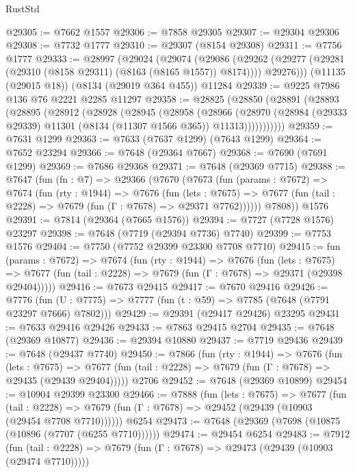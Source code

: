 \begin{lexlean}{RustStd}
\begin{coremodule}
{\begin{coremodule}
{{{{{{{{{{{{{{{{{{{{{{{{{{{{{{{{{{{{{{{{{{{{{{{{{{{{{@29305 := @7662 @1557
@29306 := @7858 @29305
@29307 := @29304 @29306
@29308 := @7732 @1777
@29310 := @29307 (@8154 @29308)
@29311 := @7756 @1777
@29333 := @28997
    (@29024
      (@29074
        (@29086
          (@29262 (@29277 (@29281 (@29310 (@8158 @29311) (@8163 (@8165 @1557)) @8174))))
          @29276)))
    (@11135 (@29015 @18))
    (@8134 (@29019 @364 @455))
    @11284
@29339 := @9225 @7986 @136 @76 @2221 @2285 @11297
@29358 := @28825
    (@28850
      (@28891
        (@28893
          (@28895
            (@28912
              (@28928
                (@28945
                  (@28958
                    (@28966
                      (@28970
                        (@28984 (@29333 @29339) @11301 (@8134 (@11307 @1566 @365)) @11313)))))))))))
@29359 := @7631 @1299
@29363 := @7633 (@7637 @1299) (@7643 @1299)
@29364 := @7652 @23294
@29366 := @7648 (@29364 @7667)
@29368 := @7690 (@7691 @1299)
@29369 := @7686 @29368
@29371 := @7648 (@29369 @7715)
@29388 := @7647
    (fun (fn : @7) =>
    @29366
      (@7670
        (@7673
          (fun (params : @7672) =>
          @7674
            (fun (rty : @1944) =>
            @7676
              (fun (lets : @7675) =>
              @7677 (fun (tail : @2228) => @7679 (fun (Γ : @7678) => @29371 @7762))))))
        @7808))
    @1576
@29391 := @7814 (@29364 (@7665 @1576))
@29394 := @7727 (@7728 @1576) @23297
@29398 := @7648 (@7719 (@29394 @7736) @7740)
@29399 := @7753 @1576
@29404 := @7750 (@7752 @29399 @23300 @7708 @7710)
@29415 := fun (params : @7672) =>
  @7674
    (fun (rty : @1944) =>
    @7676
      (fun (lets : @7675) =>
      @7677 (fun (tail : @2228) => @7679 (fun (Γ : @7678) => @29371 (@29398 @29404)))))
@29416 := @7673 @29415
@29417 := @7670 @29416
@29426 := @7776
    (fun (U : @7775) => @7777 (fun (t : @59) => @7785 (@7648 (@7791 @23297 @7666) @7802)))
@29429 := @29391 (@29417 @29426) @23295
@29431 := @7633 @29416 @29426
@29433 := @7863 @29415 @2704
@29435 := @7648 (@29369 @10877)
@29436 := @29394 @10880
@29437 := @7719 @29436
@29439 := @7648 (@29437 @7740)
@29450 := @7866
    (fun (rty : @1944) =>
    @7676
      (fun (lets : @7675) =>
      @7677 (fun (tail : @2228) => @7679 (fun (Γ : @7678) => @29435 (@29439 @29404)))))
    @2706
@29452 := @7648 (@29369 @10899)
@29454 := @10904 @29399 @23300
@29466 := @7888
    (fun (lets : @7675) =>
    @7677
      (fun (tail : @2228) =>
      @7679 (fun (Γ : @7678) => @29452 (@29439 (@10903 (@29454 @7708 @7710))))))
    @6254
@29473 := @7648 (@29369 (@7698 (@10875 (@10896 (@7707 (@6255 @7710))))))
@29474 := @29454 @6254
@29483 := @7912
    (fun (tail : @2228) => @7679 (fun (Γ : @7678) => @29473 (@29439 (@10903 (@29474 @7710)))))
}}}}}}}}}}}}}}}}}}}}}}}}}}}}}}}}}}}}}}}}}}}}}}}}}}}}}
\end{coremodule}}
\end{coremodule}
\end{lexlean}
